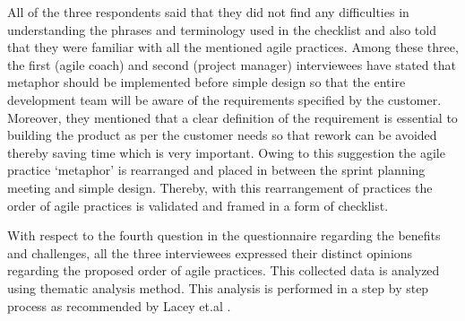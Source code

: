 \documentclass[a4paper,oneside]{bth}
\begin{document}
All of the three respondents said that they did not find any difficulties in understanding the phrases and terminology used in the checklist and also told that they were familiar with all the mentioned agile practices. Among these three, the first (agile coach) and second (project manager) interviewees have stated that metaphor should be implemented before simple design so that the entire development team will be aware of the requirements specified by the customer. Moreover, they mentioned that a clear definition of the requirement is essential to building the product as per the customer needs so that rework can be avoided thereby saving time which is very important. Owing to this suggestion the agile practice ‘metaphor’ is rearranged and placed in between the sprint planning meeting and simple design. Thereby, with this rearrangement of practices the order of agile practices is validated and framed in a form of checklist. 

With respect to the fourth question in the questionnaire regarding the benefits and challenges, all the three interviewees expressed their distinct opinions regarding the proposed order of agile practices. This collected data is analyzed using thematic analysis method. This analysis is performed in a step by step process as recommended by Lacey et.al \cite{lacey_qualitative_2001}.
\end{document}
